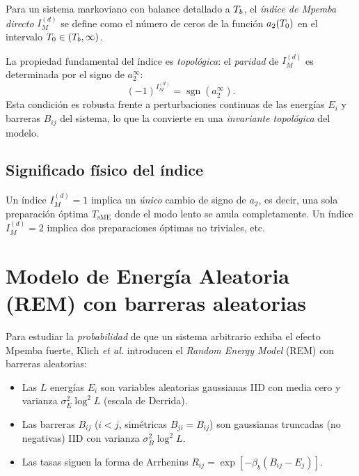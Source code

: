 \begin{definition}
\label{def:mpemba_index}
Para un sistema markoviano con balance detallado a $T_{b}$, el \emph{índice de 
Mpemba directo} $I_{M}^{(d)}$ se define como el número de ceros de la función 
$a_{2}(T_{0})$ en el intervalo $T_{0} \in (T_{b}, \infty)$.
\end{definition}

La propiedad fundamental del índice es \emph{topológica}: el \emph{paridad} de 
$I_{M}^{(d)}$ es determinada por el signo de $a_{2}^{\infty}$:
\begin{equation}
    (-1)^{I_{M}^{(d)}} = \operatorname{sgn}\!\left(a_{2}^{\infty}\right).
    \label{eq:parity_topology}
\end{equation}
%
Esta condición es robusta frente a perturbaciones continuas de las energías 
$E_i$ y barreras $B_{ij}$ del sistema, lo que la convierte en una \emph{invariante 
topológica} del modelo.

\subsection{Significado físico del índice}

Un índice $I_{M}^{(d)} = 1$ implica un \emph{único} cambio de signo de $a_{2}$, 
es decir, una sola preparación óptima $T_{\mathrm{sME}}$ donde el modo lento se 
anula completamente. Un índice $I_{M}^{(d)} = 2$ implica dos preparaciones 
óptimas no triviales, etc.

\section{Modelo de Energía Aleatoria (REM) con barreras aleatorias}

Para estudiar la \emph{probabilidad} de que un sistema arbitrario exhiba el 
efecto Mpemba fuerte, Klich \emph{et al.} introducen el \emph{Random Energy 
Model} (REM) con barreras aleatorias:

\begin{itemize}
\item Las $L$ energías $E_i$ son variables aleatorias gaussianas IID con media 
cero y varianza $\sigma_E^2 \log^2 L$ (escala de Derrida).
\item Las barreras $B_{ij}$ ($i < j$, simétricas $B_{ji} = B_{ij}$) son gaussianas 
truncadas (no negativas) IID con varianza $\sigma_B^2 \log^2 L$.
\item Las tasas siguen la forma de Arrhenius $R_{ij} = \exp[-\beta_b(B_{ij} - E_j)]$.
\end{itemize}

